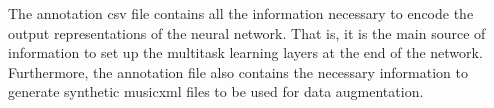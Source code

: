 
The annotation \gls{csv} file contains all the information
necessary to encode the output representations of the neural
network. That is, it is the main source of information to
set up the multitask learning layers at the end of the
network. Furthermore, the annotation file also contains the
necessary information to generate synthetic \gls{musicxml}
files to be used for data augmentation.
